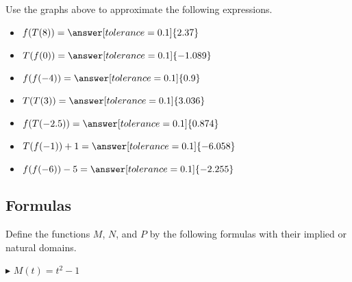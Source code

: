 \documentclass{ximera}
\begin{document}
\begin{question}


Use the graphs above to approximate the following expressions.



\begin{itemize}

\item $f(T(8)) = \answer[tolerance=0.1]{2.37}$ \\

\item $T(f(0)) = \answer[tolerance=0.1]{-1.089}$ \\

\item $f(f(-4)) = \answer[tolerance=0.1]{0.9}$ \\

\item $T(T(3)) = \answer[tolerance=0.1]{3.036}$ \\

\item $f(T(-2.5)) = \answer[tolerance=0.1]{0.874}$ \\

\item $T(f(-1))+1 = \answer[tolerance=0.1]{-6.058}$ \\

\item $f(f(-6)) -5 = \answer[tolerance=0.1]{-2.255}$ \\

\end{itemize}



\end{question}

















\subsection*{Formulas}


Define the functions $M$, $N$, and $P$ by the following formulas with their implied or natural domains.

$\blacktriangleright$  $M(t) = t^2 - 1$ \\
\end{document}
